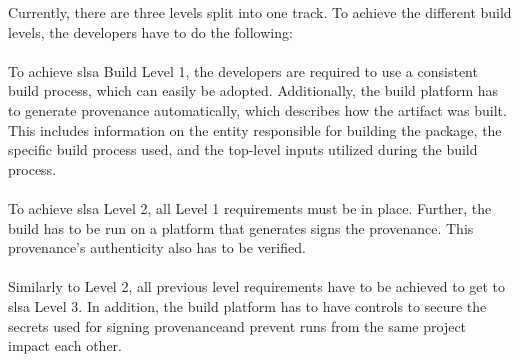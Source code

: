 Currently, there are three levels split into one track. To achieve the different build levels, the developers have to do the following:
\\~\\
To achieve \acrshort{slsa} Build Level 1, the developers are required to use a consistent build process, which can easily be adopted. Additionally, the build platform has to generate \gls{provenance} automatically, which describes how the artifact was built. This includes information on the entity responsible for building the package, the specific build process used, and the top-level inputs utilized during the build process.
\\~\\
To achieve \acrshort{slsa} Level 2, all Level 1 requirements must be in place. Further, the build has to be run on a platform that generates signs the \gls{provenance}. This \gls{provenance}'s authenticity also has to be verified.
\\~\\
Similarly to Level 2, all previous level requirements have to be achieved to get to \acrshort{slsa} Level 3. In addition, the build platform has to have controls to secure the secrets used for signing \gls{provenance}and prevent runs from the same project impact each other. 


